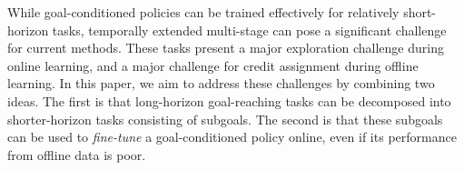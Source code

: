 While goal-conditioned policies can be trained effectively for relatively short-horizon tasks, temporally extended multi-stage can pose a significant challenge for current methods. These tasks present a major exploration challenge during online learning, and a major challenge for credit assignment during offline learning.
In this paper, we aim to address these challenges by combining two ideas. The first is that long-horizon goal-reaching tasks can be decomposed into shorter-horizon tasks consisting of subgoals. The second is that these subgoals can be used to \emph{fine-tune} a goal-conditioned policy online, even if its performance from offline data is poor.
